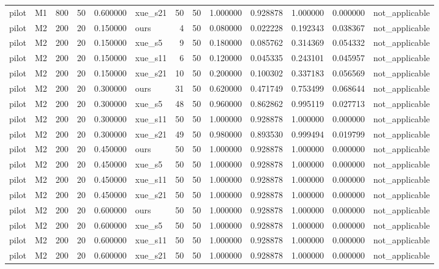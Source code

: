 \begin{longtable}{llrrrlrrrrrrl}
pilot & M1 & 800 & 50 & 0.600000 & xue\_s21 & 50 & 50 & 1.000000 & 0.928878 & 1.000000 & 0.000000 & not\_applicable \\
pilot & M2 & 200 & 20 & 0.150000 & ours & 4 & 50 & 0.080000 & 0.022228 & 0.192343 & 0.038367 & not\_applicable \\
pilot & M2 & 200 & 20 & 0.150000 & xue\_s5 & 9 & 50 & 0.180000 & 0.085762 & 0.314369 & 0.054332 & not\_applicable \\
pilot & M2 & 200 & 20 & 0.150000 & xue\_s11 & 6 & 50 & 0.120000 & 0.045335 & 0.243101 & 0.045957 & not\_applicable \\
pilot & M2 & 200 & 20 & 0.150000 & xue\_s21 & 10 & 50 & 0.200000 & 0.100302 & 0.337183 & 0.056569 & not\_applicable \\
pilot & M2 & 200 & 20 & 0.300000 & ours & 31 & 50 & 0.620000 & 0.471749 & 0.753499 & 0.068644 & not\_applicable \\
pilot & M2 & 200 & 20 & 0.300000 & xue\_s5 & 48 & 50 & 0.960000 & 0.862862 & 0.995119 & 0.027713 & not\_applicable \\
pilot & M2 & 200 & 20 & 0.300000 & xue\_s11 & 50 & 50 & 1.000000 & 0.928878 & 1.000000 & 0.000000 & not\_applicable \\
pilot & M2 & 200 & 20 & 0.300000 & xue\_s21 & 49 & 50 & 0.980000 & 0.893530 & 0.999494 & 0.019799 & not\_applicable \\
pilot & M2 & 200 & 20 & 0.450000 & ours & 50 & 50 & 1.000000 & 0.928878 & 1.000000 & 0.000000 & not\_applicable \\
pilot & M2 & 200 & 20 & 0.450000 & xue\_s5 & 50 & 50 & 1.000000 & 0.928878 & 1.000000 & 0.000000 & not\_applicable \\
pilot & M2 & 200 & 20 & 0.450000 & xue\_s11 & 50 & 50 & 1.000000 & 0.928878 & 1.000000 & 0.000000 & not\_applicable \\
pilot & M2 & 200 & 20 & 0.450000 & xue\_s21 & 50 & 50 & 1.000000 & 0.928878 & 1.000000 & 0.000000 & not\_applicable \\
pilot & M2 & 200 & 20 & 0.600000 & ours & 50 & 50 & 1.000000 & 0.928878 & 1.000000 & 0.000000 & not\_applicable \\
pilot & M2 & 200 & 20 & 0.600000 & xue\_s5 & 50 & 50 & 1.000000 & 0.928878 & 1.000000 & 0.000000 & not\_applicable \\
pilot & M2 & 200 & 20 & 0.600000 & xue\_s11 & 50 & 50 & 1.000000 & 0.928878 & 1.000000 & 0.000000 & not\_applicable \\
pilot & M2 & 200 & 20 & 0.600000 & xue\_s21 & 50 & 50 & 1.000000 & 0.928878 & 1.000000 & 0.000000 & not\_applicable \\

\end{longtable}
